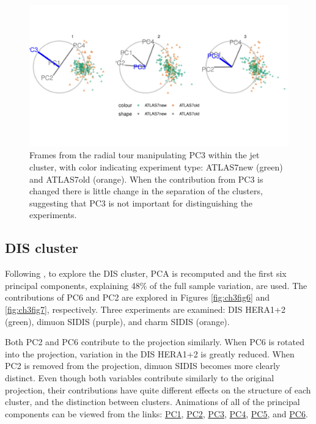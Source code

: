 \documentclass{monashthesis}
\begin{document}
\begin{figure}

{\centering \includegraphics[width=1\linewidth,]{./figures_from_script/ch3_fig5_jet_worse_pc3} 

}

\caption{Frames from the radial tour manipulating PC3 within the jet cluster, with color indicating experiment type: ATLAS7new (green) and ATLAS7old (orange).  When the contribution from PC3 is changed there is little change in the separation of the clusters, suggesting that PC3 is not important for distinguishing the experiments.}\label{fig:ch3fig5}
\end{figure}

\hypertarget{dis-cluster}{%
\subsection{DIS cluster}\label{dis-cluster}}

Following \textcite{cook_dynamical_2018}, to explore the DIS cluster, PCA is recomputed and the first six principal components, explaining 48\% of the full sample variation, are used. The contributions of PC6 and PC2 are explored in Figures \ref{fig:ch3fig6} and \ref{fig:ch3fig7}, respectively. Three experiments are examined: DIS HERA1+2 (green), dimuon SIDIS (purple), and charm SIDIS (orange).

Both PC2 and PC6 contribute to the projection similarly. When PC6 is rotated into the projection, variation in the DIS HERA1+2 is greatly reduced. When PC2 is removed from the projection, dimuon SIDIS becomes more clearly distinct. Even though both variables contribute similarly to the original projection, their contributions have quite different effects on the structure of each cluster, and the distinction between clusters. Animations of all of the principal components can be viewed from the links: \href{https://github.com/nspyrison/spinifex_paper/blob/master/paper/gifs/discluster_manualtour_pc1.gif}{PC1}, \href{https://github.com/nspyrison/spinifex_paper/blob/master/paper/gifs/discluster_manualtour_pc2.gif}{PC2}, \href{https://github.com/nspyrison/spinifex_paper/blob/master/paper/gifs/discluster_manualtour_pc3.gif}{PC3}, \href{https://github.com/nspyrison/spinifex_paper/blob/master/paper/gifs/discluster_manualtour_pc4.gif}{PC4}, \href{https://github.com/nspyrison/spinifex_paper/blob/master/paper/gifs/discluster_manualtour_pc5.gif}{PC5}, and \href{https://github.com/nspyrison/spinifex_paper/blob/master/paper/gifs/discluster_manualtour_pc6.gif}{PC6}.
\end{document}
